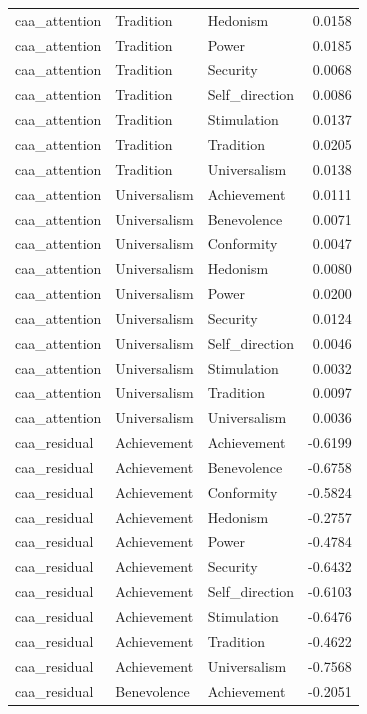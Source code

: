 \begin{tabular}{lllr}
caa\_attention & Tradition & Hedonism & 0.0158 \\
caa\_attention & Tradition & Power & 0.0185 \\
caa\_attention & Tradition & Security & 0.0068 \\
caa\_attention & Tradition & Self\_direction & 0.0086 \\
caa\_attention & Tradition & Stimulation & 0.0137 \\
caa\_attention & Tradition & Tradition & 0.0205 \\
caa\_attention & Tradition & Universalism & 0.0138 \\
caa\_attention & Universalism & Achievement & 0.0111 \\
caa\_attention & Universalism & Benevolence & 0.0071 \\
caa\_attention & Universalism & Conformity & 0.0047 \\
caa\_attention & Universalism & Hedonism & 0.0080 \\
caa\_attention & Universalism & Power & 0.0200 \\
caa\_attention & Universalism & Security & 0.0124 \\
caa\_attention & Universalism & Self\_direction & 0.0046 \\
caa\_attention & Universalism & Stimulation & 0.0032 \\
caa\_attention & Universalism & Tradition & 0.0097 \\
caa\_attention & Universalism & Universalism & 0.0036 \\
caa\_residual & Achievement & Achievement & -0.6199 \\
caa\_residual & Achievement & Benevolence & -0.6758 \\
caa\_residual & Achievement & Conformity & -0.5824 \\
caa\_residual & Achievement & Hedonism & -0.2757 \\
caa\_residual & Achievement & Power & -0.4784 \\
caa\_residual & Achievement & Security & -0.6432 \\
caa\_residual & Achievement & Self\_direction & -0.6103 \\
caa\_residual & Achievement & Stimulation & -0.6476 \\
caa\_residual & Achievement & Tradition & -0.4622 \\
caa\_residual & Achievement & Universalism & -0.7568 \\
caa\_residual & Benevolence & Achievement & -0.2051 \\

\end{tabular}
